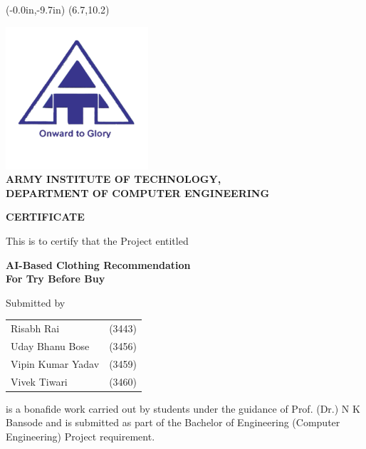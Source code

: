\thisfancyput(-0.0in,-9.7in){
	\setlength{\unitlength}{1in}
	\framebox(6.7,10.2)
}
\setlength{\parindent}{0mm}
\begin{center}
	\includegraphics[scale=0.5]{components/images/logo.png} \\[0.5cm]
	
	{
		\bfseries \large
		ARMY INSTITUTE OF TECHNOLOGY, \\
		DEPARTMENT OF COMPUTER ENGINEERING
		\vspace*{\baselineskip}
	}

	{
		\bfseries \Large
		CERTIFICATE
		\vspace*{\baselineskip}
	}

	This is to certify that the Project entitled

	\vspace*{\baselineskip}

	{
		\bfseries \Large
		AI-Based Clothing Recommendation \\ For Try Before Buy \\
		\vspace*{\baselineskip}
	}

	Submitted by
	
	\begin{table}[h!]
		\centering
		\begin{tabular}{ l r }
			Risabh Rai \hspace{25mm} & (3443) \\
			Uday Bhanu Bose \hspace{25mm} & (3456) \\
			Vipin Kumar Yadav \hspace{25mm} & (3459) \\
			Vivek Tiwari \hspace{25mm} & (3460) \\
		\end{tabular}
	\end{table}
\end{center}

is a bonafide work carried out by students under the guidance of Prof. (Dr.) N K Bansode and is submitted as part of the Bachelor of Engineering (Computer Engineering) Project requirement.

